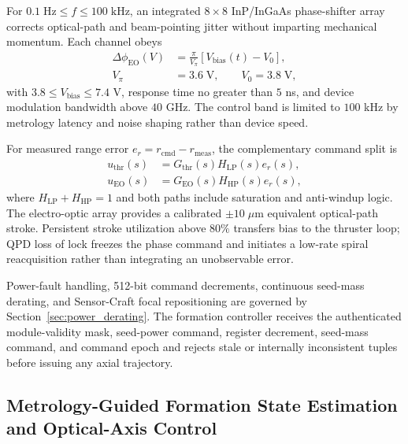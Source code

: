 \documentclass[10pt,twocolumn]{IEEEtran}
\begin{document}
For $0.1\;\mathrm{Hz}\leq f\leq100\;\mathrm{kHz}$, an integrated $8\times8$ InP/InGaAs phase-shifter array corrects optical-path and beam-pointing jitter without imparting mechanical momentum.  Each channel obeys
\begin{equation}
\begin{aligned}
\Delta\phi_{\mathrm{EO}}(V)
&=\frac{\pi}{V_\pi}\left[V_{\mathrm{bias}}(t)-V_0\right],\\
V_\pi&=3.6\;\mathrm{V},\qquad V_0=3.8\;\mathrm{V},
\end{aligned}
\label{eq:eo_phase_control}
\end{equation}
with $3.8\leq V_{\mathrm{bias}}\leq7.4$ V, response time no greater than $5$ ns, and device modulation bandwidth above $40$ GHz.  The control band is limited to $100$ kHz by metrology latency and noise shaping rather than device speed.

For measured range error $e_r=r_{\mathrm{cmd}}-r_{\mathrm{meas}}$, the complementary command split is
\begin{equation}
\begin{aligned}
u_{\mathrm{thr}}(s)&=G_{\mathrm{thr}}(s)H_{\mathrm{LP}}(s)e_r(s),\\
u_{\mathrm{EO}}(s)&=G_{\mathrm{EO}}(s)H_{\mathrm{HP}}(s)e_r(s),
\end{aligned}
\label{eq:complementary_control}
\end{equation}
where $H_{\mathrm{LP}}+H_{\mathrm{HP}}=1$ and both paths include saturation and anti-windup logic.  The electro-optic array provides a calibrated $\pm10\;\mu\mathrm{m}$ equivalent optical-path stroke.  Persistent stroke utilization above $80\%$ transfers bias to the thruster loop; QPD loss of lock freezes the phase command and initiates a low-rate spiral reacquisition rather than integrating an unobservable error.

Power-fault handling, 512-bit command decrements, continuous seed-mass
derating, and Sensor-Craft focal repositioning are governed by
Section~\ref{sec:power_derating}.  The formation controller receives the
authenticated module-validity mask, seed-power command, register decrement,
seed-mass command, and command epoch and rejects stale or internally
inconsistent tuples before issuing any axial trajectory.

\subsection{Metrology-Guided Formation State Estimation and Optical-Axis Control}
\label{sec:formation_state_estimation}
\end{document}
